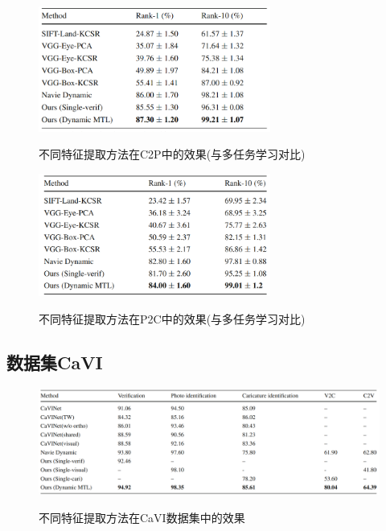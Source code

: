 \begin{figure}[H]
    \centering
    \includegraphics[width=3in]{sections/figs/eval4-1.png}
    \label{fig:my_label}
    \caption{\label{fig2.11} \xiaowuhao \hei 不同特征提取方法在C2P中的效果(与多任务学习对比)}
\end{figure}
\begin{figure}[H]
    \centering
    \includegraphics[width=3in]{sections/figs/eval4-2.png}
    \label{fig:my_label}
        \caption{\label{fig2.11} \xiaowuhao \hei 不同特征提取方法在P2C中的效果(与多任务学习对比)}
\end{figure}
\newpage
\subsection{数据集CaVI}
\begin{figure}[H]
    \centering
    \includegraphics[width=6in]{sections/figs/eval3.png}
    \label{fig:my_label}
    \caption{\label{fig2.11} \xiaowuhao \hei 不同特征提取方法在CaVI数据集中的效果}    
\end{figure}

